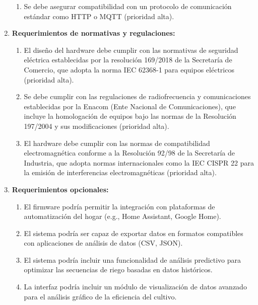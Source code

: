 \documentclass[
11pt, %
]{charter}
\begin{document}
\begin{enumerate}
	\begin{enumerate}
	\item Se debe asegurar compatibilidad con un protocolo de comunicación estándar como HTTP o MQTT (prioridad alta).
	\end{enumerate}
	\item \textbf{Requerimientos de normativas y regulaciones:}
	\begin{enumerate}
	\item El diseño del hardware debe cumplir con las normativas de seguridad eléctrica establecidas por la resolución 169/2018 de la Secretaría de Comercio, que adopta la norma IEC 62368-1 para equipos eléctricos (prioridad alta).
	\item  Se debe cumplir con las regulaciones de radiofrecuencia y comunicaciones establecidas por la Enacom (Ente Nacional de Comunicaciones), que incluye la homologación de equipos bajo las normas de la Resolución 197/2004 y sus modificaciones (prioridad alta).
	\item El hardware debe cumplir con las normas de compatibilidad electromagnética conforme a la Resolución 92/98 de la Secretaría de Industria, que adopta normas internacionales como la IEC CISPR 22 para la emisión de interferencias electromagnéticas (prioridad alta).
	\end{enumerate}
	\item \textbf{Requerimientos opcionales:}
	\begin{enumerate}
	\item El firmware podría permitir la integración con plataformas de automatización del hogar (e.g., Home Assistant, Google Home).
	\item El sistema podría ser capaz de exportar datos en formatos compatibles con aplicaciones de análisis de datos (CSV, JSON).
	\item El sistema podría incluir una funcionalidad de análisis predictivo para optimizar las secuencias de riego basadas en datos históricos.
	\item La interfaz podría incluir un módulo de visualización de datos avanzado para el análisis gráfico de la eficiencia del cultivo.
	\end{enumerate}
\end{enumerate}


\end{document}
